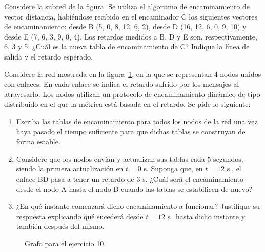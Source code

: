 \begin{ejercicio}
    Considere la subred de la figura. Se utiliza el algoritmo de encaminamiento de vector distancia, habiéndose recibido en el encaminador C los siguientes vectores de encaminamiento: desde B (5, 0, 8, 12, 6, 2), desde D (16, 12, 6, 0, 9, 10) y desde E (7, 6, 3, 9, 0, 4). Los retardos medidos a B, D y E son, respectivamente, 6, 3 y 5. ¿Cuál es la nueva tabla de encaminamiento de C\@? Indique la línea de salida y el retardo esperado.
\end{ejercicio}

\begin{ejercicio}
    Considere la red mostrada en la figura~\ref{grafo:ej10}, en la que se representan 4 nodos unidos con enlaces. En cada enlace se indica el retardo sufrido por los mensajes al atravesarlo. Los nodos utilizan un protocolo de encaminamiento dinámico de tipo distribuido en el que la métrica está basada en el retardo. Se pide lo siguiente:
    \begin{enumerate}[label=\alph*.]
        \item Escriba las tablas de encaminamiento para todos los nodos de la red una vez haya pasado el tiempo suficiente para que dichas tablas se construyan de forma estable.
        \item Considere que los nodos envían y actualizan sus tablas cada 5 segundos, siendo la primera actualización en $t=0$ s. Suponga que, en $t=12$ s., el enlace BD pasa a tener un retardo de 3 s. ¿Cuál será el encaminamiento desde el nodo A hasta el nodo B cuando las tablas se estabilicen de nuevo?
        \item ¿En qué instante comenzará dicho encaminamiento a funcionar? Justifique su respuesta explicando qué sucederá desde $t=12$ s.\ hasta dicho instante y también después del mismo.
    \end{enumerate}

    \begin{figure}[H]
    \centering
    \caption{Grafo para el ejercicio 10.}
    \label{grafo:ej10}
    \end{figure}
\end{ejercicio}


